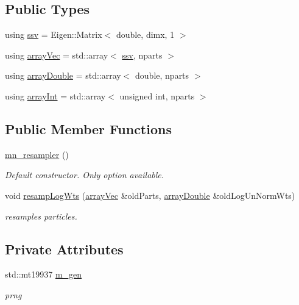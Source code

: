 \subsection*{Public Types}
\begin{DoxyCompactItemize}
\item 
using \hyperlink{classpf_1_1mn__resampler_a88c55c4d05bf91b0a2e6c07d889e94bf}{ssv} = Eigen\+::\+Matrix$<$ double, dimx, 1 $>$
\item 
using \hyperlink{classpf_1_1mn__resampler_a42375cc080fb301e33d323c3ceb34f20}{array\+Vec} = std\+::array$<$ \hyperlink{classpf_1_1rbase_a47a4bdc0e3c08b72ce4f24a18d5b0e04}{ssv}, nparts $>$
\item 
using \hyperlink{classpf_1_1mn__resampler_a955686138dfb4b814c02eca3d1fc0fa9}{array\+Double} = std\+::array$<$ double, nparts $>$
\item 
using \hyperlink{classpf_1_1mn__resampler_a72e4f61199b83289d694323a05fdd1ef}{array\+Int} = std\+::array$<$ unsigned int, nparts $>$
\end{DoxyCompactItemize}
\subsection*{Public Member Functions}
\begin{DoxyCompactItemize}
\item 
\hyperlink{classpf_1_1mn__resampler_a085cc0be4c278d949b27e2eac17180d6}{mn\+\_\+resampler} ()\hypertarget{classpf_1_1mn__resampler_a085cc0be4c278d949b27e2eac17180d6}{}\label{classpf_1_1mn__resampler_a085cc0be4c278d949b27e2eac17180d6}

\begin{DoxyCompactList}\small\item\em Default constructor. Only option available. \end{DoxyCompactList}\item 
void \hyperlink{classpf_1_1mn__resampler_a9fe1aa27517fc0333f2fa82653a4d9fc}{resamp\+Log\+Wts} (\hyperlink{classpf_1_1rbase_a89951bb3872c1c6a0c3da0962a9aaa13}{array\+Vec} \&old\+Parts, \hyperlink{classpf_1_1rbase_a37b2d02d00f75d9550122b763cbb3fed}{array\+Double} \&old\+Log\+Un\+Norm\+Wts)
\begin{DoxyCompactList}\small\item\em resamples particles. \end{DoxyCompactList}\end{DoxyCompactItemize}
\subsection*{Private Attributes}
\begin{DoxyCompactItemize}
\item 
std\+::mt19937 \hyperlink{classpf_1_1mn__resampler_a463059a4eed72e18bc02034bfe4bb8f3}{m\+\_\+gen}\hypertarget{classpf_1_1mn__resampler_a463059a4eed72e18bc02034bfe4bb8f3}{}\label{classpf_1_1mn__resampler_a463059a4eed72e18bc02034bfe4bb8f3}

\begin{DoxyCompactList}\small\item\em prng \end{DoxyCompactList}\end{DoxyCompactItemize}


